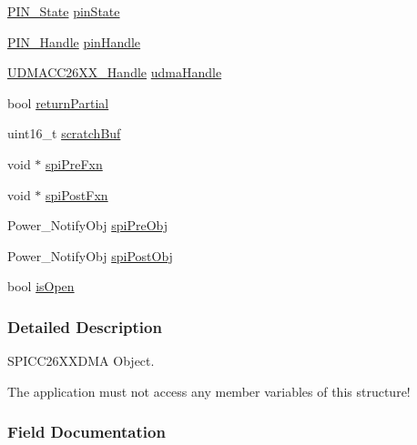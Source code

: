 \begin{DoxyCompactItemize}
\item 
\hyperlink{_p_i_n_8h_a36ef69d50df6baa6973482669c24a522}{P\-I\-N\-\_\-\-State} \hyperlink{struct_s_p_i_c_c26_x_x___object_a44cd8db1ee357299536e7a2646e304b2}{pin\-State}
\item 
\hyperlink{_p_i_n_8h_afb2de52b054638f63c39df1f30a0d88d}{P\-I\-N\-\_\-\-Handle} \hyperlink{struct_s_p_i_c_c26_x_x___object_a1cf54e17c9c9bda21af9de9f5ce672b8}{pin\-Handle}
\item 
\hyperlink{_u_d_m_a_c_c26_x_x_8h_a969a9feb0f822c4764ef1da2ff5066cf}{U\-D\-M\-A\-C\-C26\-X\-X\-\_\-\-Handle} \hyperlink{struct_s_p_i_c_c26_x_x___object_a1c92976c3583ba7a873e318c147be4f4}{udma\-Handle}
\item 
bool \hyperlink{struct_s_p_i_c_c26_x_x___object_a9a9195eeb78008c23cbb6f3297854753}{return\-Partial}
\item 
uint16\-\_\-t \hyperlink{struct_s_p_i_c_c26_x_x___object_af9de6127395082bb9b1449af0762e4ad}{scratch\-Buf}
\item 
void $\ast$ \hyperlink{struct_s_p_i_c_c26_x_x___object_a4ecd6275e390c3c37245d65f135fd829}{spi\-Pre\-Fxn}
\item 
void $\ast$ \hyperlink{struct_s_p_i_c_c26_x_x___object_a5cf441f9689eb0548478d8eef105d9cb}{spi\-Post\-Fxn}
\item 
Power\-\_\-\-Notify\-Obj \hyperlink{struct_s_p_i_c_c26_x_x___object_a2468307877f8a031156937f452becf98}{spi\-Pre\-Obj}
\item 
Power\-\_\-\-Notify\-Obj \hyperlink{struct_s_p_i_c_c26_x_x___object_ad5d62652fb04c0cc1d27e20beaaa7d8f}{spi\-Post\-Obj}
\item 
bool \hyperlink{struct_s_p_i_c_c26_x_x___object_aad3b6548b2adec791c856b725f3d768b}{is\-Open}
\end{DoxyCompactItemize}


\subsubsection{Detailed Description}
S\-P\-I\-C\-C26\-X\-X\-D\-M\-A Object. 

The application must not access any member variables of this structure! 

\subsubsection{Field Documentation}
